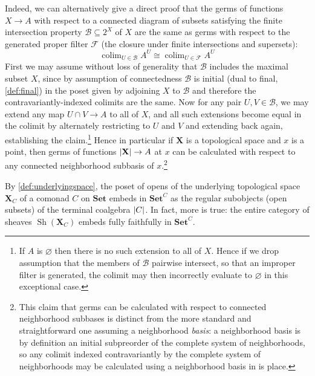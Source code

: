 \documentclass[11pt, oneside, article]{memoir}
\theoremstyle{plain}
\theoremstyle{definition}
\theoremstyle{remark}
\newenvironment{remark}
{\renewcommand\qedsymbol{$\lrcorner$}%
  \pushQED{\qed}\myremark}
{\popQED\endmyremark}
\DeclareMathOperator{\Sh}{Sh}
\DeclareMathOperator*{\colim}{colim}
\DeclarePairedDelimiter{\abs}{\lvert}{\rvert}
\newcommand{\Pow}[1]{2^{#1}}
\newcommand{\namedcat}[1]{\mathbf{#1}}
\newcommand{\spa}[1]{\mathbf{#1}}
\newcommand{\Set}{\namedcat{Set}}
\newcommand{\CoalgOn}[2]{{#2}^{#1}}
\newcommand{\CoalgSet}[1]{\CoalgOn{#1}{\Set}}
\newcommand{\pts}[1]{{\abs{#1}}}
\newcommand{\cmnd}[1]{{#1}}
\newcommand{\xA}{A}
\newcommand{\xX}{X}
\newcommand{\cC}{\cmnd{C}}
\newcommand{\tX}{\spa{X}}
\newcommand{\CSet}{\CoalgSet{\cC}}
\newcommand{\cmdtotop}[1]{{\tX_{#1}}}
\begin{document}
\begin{remark}
  Indeed, we can alternatively give a direct proof that the germs of
  functions $\xX \to \xA$ with respect to a connected diagram of
  subsets satisfying the finite intersection property
  $\mathcal{B} \subseteq \Pow{\xX}$ of $\xX$ are the same as germs
  with respect to the generated proper filter $\mathcal{F}$ (the
  closure under finite intersections and supersets):
  \[\colim_{U \in \mathcal{B}} \xA^U \cong \colim_{U \in \mathcal{F}} \xA^U\]
  First we may assume without loss of generality that $\mathcal{B}$
  includes the maximal subset $X$, since by assumption of
  connectedness $\mathcal{B}$ is initial (dual to final,
  \cref{def:final}) in the poset given by adjoining $X$ to
  $\mathcal{B}$ and therefore the contravariantly-indexed colimits are
  the same. Now for any pair $U, V \in \mathcal{B}$, we may extend any
  map $U \cap V \to \xA$ to all of $\xX$, and all such extensions
  become equal in the colimit by alternately restricting to $U$ and
  $V$ and extending back again, establishing the claim.\footnote{If
    $\xA$ is $\varnothing$ then there is no such extension to all of
    $X$. Hence if we drop assumption that the members of $\mathcal{B}$
    pairwise intersect, so that an improper filter is generated, the
    colimit may then incorrectly evaluate to $\varnothing$ in this
    exceptional case.} Hence in particular if $\tX$ is a topological
  space and $x$ is a point, then germs of functions
  $\pts{\tX} \to \xA$ at $x$ can be calculated with respect to any
  connected neighborhood subbasis of $x$.\footnote{This claim that
    germs can be calculated with respect to connected neighborhood
    subbases is distinct from the more standard and straightforward
    one assuming a neighborhood \emph{basis}: a neighborhood basis is
    by definition an initial subpreorder of the complete system of
    neighborhoods, so any colimit indexed contravariantly by the
    complete system of neighborhoods may be calculated using a
    neighborhood basis in is place.}
\end{remark}

By \cref{def:underlyingspace}, the poset of opens of the
underlying topological space $\cmdtotop{\cC}$ of a comonad $\cC$ on
$\Set$ embeds in $\CSet$ as the regular subobjects (open subsets)
of the terminal coalgebra $\pts{\cC}$. In fact, more is true: the
entire category of sheaves $\Sh(\cmdtotop{\cC})$ embeds fully
faithfully in $\CSet$.
\end{document}

